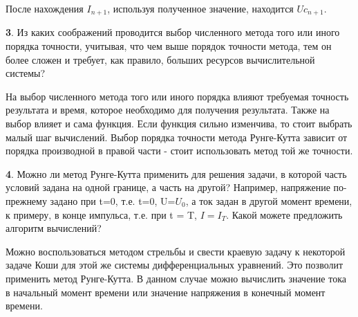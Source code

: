 \documentclass[a4paper,oneside,12pt]{extreport}
\begin{document}
После нахождения $I_{n+1}$, используя полученное значение, находится $Uc_{n+1}$. 

\textbf{3}. Из каких соображений проводится выбор численного метода того или иного порядка
точности, учитывая, что чем выше порядок точности метода, тем он более сложен 
и требует, как правило, больших ресурсов вычислительной системы?

На выбор численного метода того или иного порядка влияют требуемая точность результата
и время, которое необходимо для получения результата.
Также на выбор влияет и сама функция.
Если функция сильно изменчива, то стоит выбрать малый шаг вычислений.
Выбор порядка точности метода Рунге-Кутта зависит от порядка производной в правой части - 
стоит использовать метод той же точности.

\textbf{4}. Можно ли метод Рунге-Кутта применить для решения задачи, в которой часть условий
задана на одной границе, а часть на другой?
Например, напряжение по-прежнему задано при t=0, т.е. t=0, U=$U_0$, 
а ток задан в другой момент времени, к примеру, в конце импульса, т.е. при 
t = T, $I=I_T$.  Какой можете предложить алгоритм вычислений?

Можно воспользоваться методом стрельбы и свести краевую задачу к некоторой задаче 
Коши для этой же системы дифференциальных уравнений.
Это позволит применить метод Рунге-Кутта.
В данном случае можно вычислить значение тока в начальный момент
времени или значение напряжения в конечный момент времени.
\end{document}
